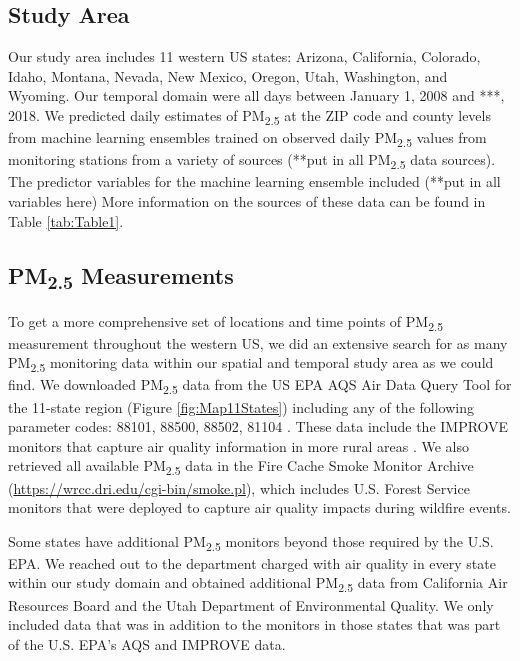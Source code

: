 \documentclass[english]{article}
\begin{document}
\subsection*{Study Area}

Our study area includes 11 western US states: Arizona, California, Colorado, Idaho, Montana, Nevada, New Mexico, Oregon, Utah, Washington, and Wyoming. Our temporal domain were all days between January 1, 2008 and ***, 2018. We predicted daily estimates of PM\textsubscript{2.5} at the ZIP code and county levels from machine learning ensembles trained on observed daily PM\textsubscript{2.5} values from monitoring stations from a variety of sources (**put in all PM\textsubscript{2.5} data sources). The predictor variables for the machine learning ensemble included (**put in all variables here) %
More information on the sources of these data can be found in Table \ref{tab:Table1}.  


\subsection*{PM\textsubscript{2.5} Measurements}
To get a more comprehensive set of locations and time points of PM\textsubscript{2.5} measurement throughout the western US, we did an extensive search for as many PM\textsubscript{2.5} monitoring data within our spatial and temporal study area as we could find. We downloaded PM\textsubscript{2.5} data from the US EPA AQS Air Data Query Tool \cite{EPAAirData2017}  for the 11-state region (Figure \ref{fig:Map11States}) including any of the following parameter codes: 88101, 88500, 88502, 81104 \cite{EPANPM25Memo2017,EPANPM25Parameters2017,EPANAllParameters2017}. These data include the IMPROVE monitors that capture air quality information in more rural areas \cite{EPANPM25IMPROVE2017}. We also retrieved all available PM\textsubscript{2.5} data in the Fire Cache Smoke Monitor Archive (\url{https://wrcc.dri.edu/cgi-bin/smoke.pl}), which includes U.S. Forest Service monitors that were deployed to capture air quality impacts during wildfire events. 

Some states have additional PM\textsubscript{2.5} monitors beyond those required by the U.S. EPA. We reached out to the department charged with air quality in every state within our study domain and obtained additional PM\textsubscript{2.5} data from California Air Resources Board and the Utah Department of Environmental Quality. We only included data that was in addition to the monitors in those states that was part of the U.S. EPA's AQS and IMPROVE data.   
\end{document}
